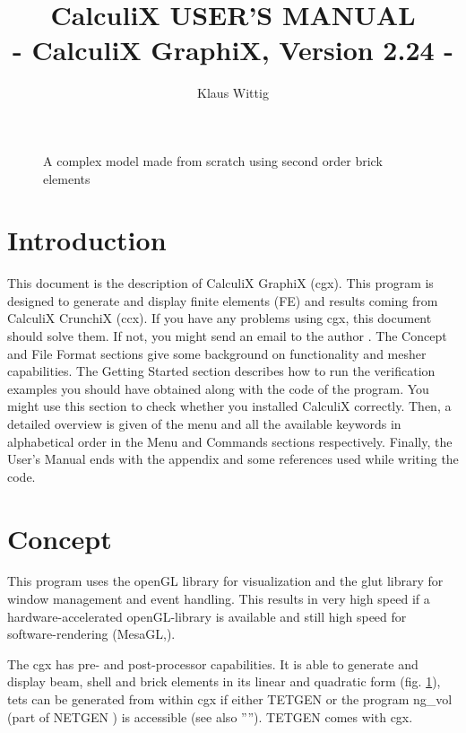 \documentclass{article}
\begin{document}
\title{CalculiX USER'S MANUAL\\ - CalculiX GraphiX, Version 2.24 -}
\author{Klaus Wittig}
\maketitle
\begin{figure}[h]
\caption{\label{cover} A complex model made from scratch using second order brick elements }
\end{figure}
\newpage


\tableofcontents


\section{Introduction}
 This document is the description of CalculiX GraphiX (cgx). This program is designed to generate and display finite elements (FE) and results coming from CalculiX CrunchiX (ccx). If you have any problems using cgx, this document should solve them. If not, you might send an email to the author \cite{cgx}. The Concept and File Format sections give some background on functionality and mesher capabilities. The Getting Started section describes how to run the verification examples you should have obtained along with the code of the program. You might use this section to check whether you installed CalculiX correctly. Then, a detailed overview is given of the menu and all the available keywords in alphabetical order in the Menu and Commands sections respectively. Finally, the User's Manual ends with the appendix and some references used while writing the code.


\section{Concept}
This program uses the openGL library for visualization and the glut library \cite{glut} for window management and event handling. This results in very high speed if a hardware-accelerated openGL-library is available and still high speed for software-rendering (MesaGL,\cite{mesa}). 

The cgx has pre- and post-processor capabilities. It is able to generate and display beam, shell and brick elements in its linear and quadratic form (fig. \ref{cover}), tets can be generated from within cgx if either TETGEN \cite{TETGEN} or the program ng\_vol (part of NETGEN \cite{NETGEN}) is accessible (see also ''''). TETGEN comes with cgx.
\end{document}
